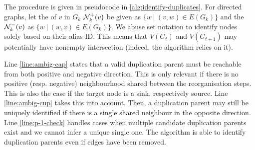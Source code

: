 \documentclass[
	fontsize=10pt, %
	twoside=false, %
	secnumdepth=1, %
  toc=indentunnumbered %
]{kaobook}
\begin{document}
The procedure is given in pseudocode in \ref{alg:identify-duplicates}. For
directed graphs, let the  of $v$ in $G_k$
$\mathcal{N}_k^+(v)$ be given as $\{w ~|~ (v,w) \in E(G_{k})\}$ and the  $\mathcal{N}_k^-(v)$ as $\{w ~|~ (w,v) \in E(G_k)\}$. We abuse set
notation to identify nodes solely based on their alias ID. This means that
$V(G_t)$ and $V(G_{t+1})$ may potentially have nonempty intersection (indeed,
the algorithm relies on it).

Line \ref{line:ambig-cap} states that a valid duplication parent must be
reachable from both positive and negative direction. This is only relevant if
there is no positive (resp. negative) neighbourhood shared between the
reorganisation steps. This is also the case if the target node is a sink, 
respectively source. Line \ref{line:ambig-cup} takes this into account. Then, a
duplication parent may still be uniquely identified if there is a single shared
neighbour in the opposite direction.
Line \ref{line:p-1-check} handles cases when multiple candidate duplication
parents exist and we cannot infer a unique single one.
The algorithm is able to identify duplication parents even if edges have been
removed.



\end{document}

